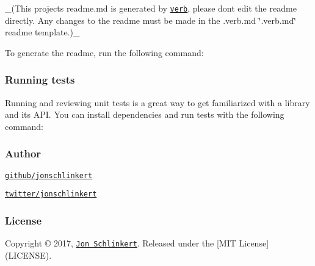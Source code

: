 {\ttfamily }

{\ttfamily \+\_\+(This project\textquotesingle{}s readme.\+md is generated by \href{https://github.com/verbose/verb-generate-readme}{\tt verb}, please don\textquotesingle{}t edit the readme directly. Any changes to the readme must be made in the .verb.\+md \char`\"{}.\+verb.\+md\char`\"{} readme template.)\+\_\+}

{\ttfamily To generate the readme, run the following command\+:}

{\ttfamily 
{}
}

{\ttfamily \subsubsection*{Running tests}}

{\ttfamily }

{\ttfamily Running and reviewing unit tests is a great way to get familiarized with a library and its A\+PI. You can install dependencies and run tests with the following command\+:}

{\ttfamily 
{}
}

{\ttfamily \subsubsection*{Author}}

{\ttfamily }

{}

{\ttfamily 
\begin{DoxyItemize}
\item \href{https://github.com/jonschlinkert}{\tt github/jonschlinkert}
\item \href{https://twitter.com/jonschlinkert}{\tt twitter/jonschlinkert}
\end{DoxyItemize}}

{\ttfamily \subsubsection*{License}}

{\ttfamily }

{\ttfamily Copyright © 2017, \href{https://github.com/jonschlinkert}{\tt Jon Schlinkert}. Released under the \mbox{[}M\+IT License\mbox{]}(L\+I\+C\+E\+N\+SE).}

{\ttfamily 

}

{ }